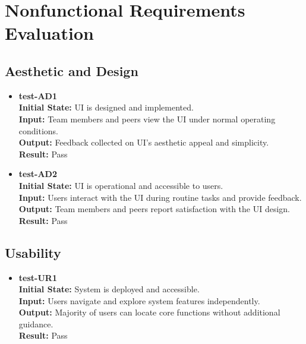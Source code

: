 \documentclass[12pt, titlepage]{article}
\begin{document}
\section{Nonfunctional Requirements Evaluation} \label{section:4}

\subsection{Aesthetic and Design} \label{section:4.1}

\begin{itemize}
\item \textbf{test-AD1} \label{test-AD1} \\
\textbf{Initial State:} UI is designed and implemented. \\
\textbf{Input:} Team members and peers view the UI under normal operating conditions. \\
\textbf{Output:} Feedback collected on UI’s aesthetic appeal and simplicity. \\
\textbf{Result:} Pass \\

\item \textbf{test-AD2} \label{test-AD2} \\
\textbf{Initial State:} UI is operational and accessible to users. \\
\textbf{Input:} Users interact with the UI during routine tasks and provide feedback. \\
\textbf{Output:} Team members and peers report satisfaction with the UI design. \\
\textbf{Result:} Pass \\
\end{itemize}

\subsection{Usability} \label{section:4.2}

\begin{itemize}
\item \textbf{test-UR1} \label{test-UR1} \\
\textbf{Initial State:} System is deployed and accessible. \\
\textbf{Input:} Users navigate and explore system features independently. \\
\textbf{Output:} Majority of users can locate core functions without additional guidance. \\
\textbf{Result:} Pass \\
\end{itemize}
\end{document}
